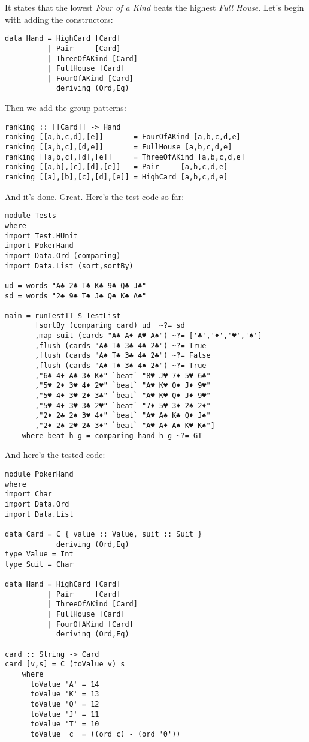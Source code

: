 It states that the lowest \emph{Four of a Kind} beats the highest \emph{Full House}.
\lhA \error Let's begin with adding the constructors:
\begin{lstlisting}[frame=single]
data Hand = HighCard [Card]
          | Pair     [Card]
          | ThreeOfAKind [Card]
          | FullHouse [Card]
          | FourOfAKind [Card]
            deriving (Ord,Eq)
\end{lstlisting}
\error Then we add the group patterns:
\begin{lstlisting}[frame=single]
ranking :: [[Card]] -> Hand
ranking [[a,b,c,d],[e]]       = FourOfAKind [a,b,c,d,e]
ranking [[a,b,c],[d,e]]       = FullHouse [a,b,c,d,e]
ranking [[a,b,c],[d],[e]]     = ThreeOfAKind [a,b,c,d,e]
ranking [[a,b],[c],[d],[e]]   = Pair     [a,b,c,d,e]
ranking [[a],[b],[c],[d],[e]] = HighCard [a,b,c,d,e] 
\end{lstlisting}
\success And it's done.
\lhN Great. Here's the test code so far:
\begin{lstlisting}[frame=single]
module Tests
where 
import Test.HUnit
import PokerHand
import Data.Ord (comparing)
import Data.List (sort,sortBy)

ud = words "A♣ 2♣ T♣ K♣ 9♣ Q♣ J♣"
sd = words "2♣ 9♣ T♣ J♣ Q♣ K♣ A♣"

main = runTestTT $ TestList 
       [sortBy (comparing card) ud  ~?= sd
       ,map suit (cards "A♣ A♦ A♥ A♠") ~?= ['♣','♦','♥','♠']
       ,flush (cards "A♣ T♣ 3♣ 4♣ 2♣") ~?= True
       ,flush (cards "A♠ T♣ 3♣ 4♣ 2♣") ~?= False
       ,flush (cards "A♠ T♠ 3♠ 4♠ 2♠") ~?= True
       ,"6♣ 4♦ A♣ 3♠ K♠" `beat` "8♥ J♥ 7♦ 5♥ 6♣"
       ,"5♥ 2♦ 3♥ 4♦ 2♥" `beat` "A♥ K♥ Q♦ J♦ 9♥"
       ,"5♥ 4♦ 3♥ 2♦ 3♣" `beat` "A♥ K♥ Q♦ J♦ 9♥"
       ,"5♥ 4♦ 3♥ 3♣ 2♥" `beat` "7♦ 5♥ 3♦ 2♠ 2♦"
       ,"2♦ 2♣ 2♠ 3♥ 4♦" `beat` "A♥ A♠ K♣ Q♦ J♠"
       ,"2♦ 2♠ 2♥ 2♣ 3♦" `beat` "A♥ A♦ A♠ K♥ K♠"]
    where beat h g = comparing hand h g ~?= GT
\end{lstlisting} %
\hspace*{\fill}
\lhA And here's the tested code:
\begin{lstlisting}[frame=single]
module PokerHand
where
import Char
import Data.Ord
import Data.List

data Card = C { value :: Value, suit :: Suit } 
            deriving (Ord,Eq)
type Value = Int
type Suit = Char

data Hand = HighCard [Card]
          | Pair     [Card]
          | ThreeOfAKind [Card]
          | FullHouse [Card]
          | FourOfAKind [Card]
            deriving (Ord,Eq)

card :: String -> Card
card [v,s] = C (toValue v) s
    where 
      toValue 'A' = 14
      toValue 'K' = 13
      toValue 'Q' = 12
      toValue 'J' = 11
      toValue 'T' = 10
      toValue  c  = ((ord c) - (ord '0'))
\end{lstlisting}
